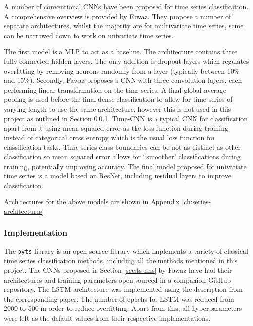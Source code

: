 A number of conventional CNNs have been proposed for time series classification. A comprehensive overview is provided by Fawaz\cite{fawaz2020deep}. They propose a number of separate architectures, whilst the majority are for multivariate time series, some can be narrowed down to work on univariate time series. 

The first model is a MLP to act as a baseline. The architecture contains three fully connected hidden layers. The only addition is dropout layers which regulates overfitting by removing neurons randomly from a layer (typically between 10\% and 15\%). Secondly, Fawaz proposes a CNN with three convolution layers, each performing linear transformation on the time series. A final global average pooling is used before the final dense classification to allow for time series of varying length to use the same architecture, however this is not used in this project as outlined in Section \ref{sec:ts-implementation}. Time-CNN is a typical CNN for classification apart from it using mean squared error as the loss function during training instead of categorical cross entropy which is the usual loss function for classification tasks. Time series class boundaries can be not as distinct as other classification so mean squared error allows for ``smoother" classifications during training, potentially improving accuracy. The final model proposed for univariate time series is a model based on ResNet, including residual layers to improve classification.

Architectures for the above models are shown in Appendix \ref{ch:series-architectures}

\subsubsection{Implementation}
\label{sec:ts-implementation}

The \verb|pyts| library\cite{faouzi2020pyts} is an open source library which implements a variety of classical time series classification methods, including all the methods mentioned in this project. The CNNs proposed in Section \ref{sec:ts-nns} by Fawaz have had their architectures and training parameters open sourced in a companion GitHub repository\cite{fawaz2019deep}. The LSTM architecture was implemented using the description from the corresponding paper. The number of epochs for LSTM was reduced from 2000 to 500 in order to reduce overfitting. Apart from this, all hyperparameters were left as the default values from their respective implementations.

